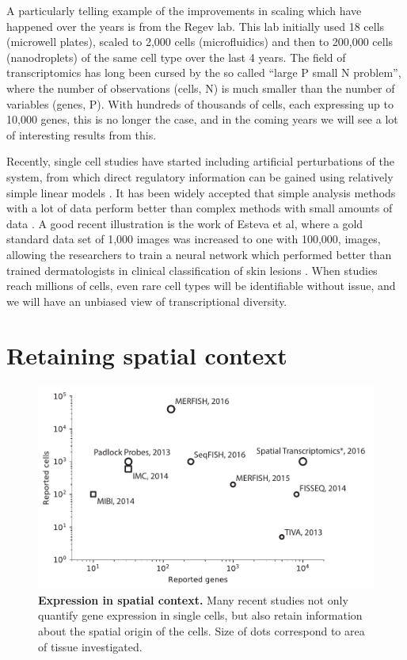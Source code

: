 A particularly telling example of the improvements in scaling which have happened over the years is from the Regev lab. This lab initially used 18 cells \cite{Shalek2014-gu} (microwell plates), scaled to 2,000 cells \cite{Shalek2014-gu} (microfluidics) and then to 200,000 cells \cite{Dixit2016-qx} (nanodroplets) of the same cell type over the last 4 years. The field of transcriptomics has long been cursed by the so called ``large P small N problem'', where the number of observations (cells, N) is much smaller than the number of variables (genes, P). With hundreds of thousands of cells, each expressing up to 10,000 genes, this is no longer the case, and in the coming years we will see a lot of interesting results from this.

Recently, single cell studies have started including artificial perturbations of the system, from which direct regulatory information can be gained using relatively simple linear models \cite{Dixit2016-qx, Jaitin2016-sj, Adamson2016-mt, Datlinger2017-aa}. It has been widely accepted that simple analysis methods with a lot of data perform better than complex methods with small amounts of data \cite{Halevy2009-uj}. A good recent illustration is the work of Esteva et al, where a gold standard data set of 1,000 images was increased to one with 100,000, images, allowing the researchers to train a neural network which performed better than trained dermatologists in clinical classification of skin lesions \cite{Esteva2017-cw}. When studies reach millions of cells, even rare cell types will be identifiable without issue, and we will have an unbiased view of transcriptional diversity.

\section{Retaining spatial context}

\begin{figure}
    \centering
    \centerline{\includegraphics[width=.75\textwidth]{"SpatialTechnologies"}}
    \caption[Expression in spatial context]{\textbf{Expression in spatial context.} Many recent studies not only quantify gene expression in single cells, but also retain information about the spatial origin of the cells. Size of dots correspond to area of tissue investigated.}
    \label{fig:spatial}
\end{figure}

